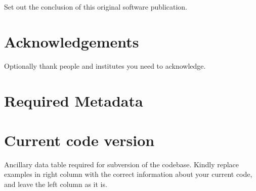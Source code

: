 \documentclass[preprint,12pt, a4paper]{elsarticle}
\begin{document}
Set out the conclusion of this original software publication.

\section*{Acknowledgements}
\label{}

Optionally thank people and institutes you need to acknowledge. 



{}







\section*{Required Metadata}
\label{}

\section*{Current code version}
\label{}

Ancillary data table required for subversion of the codebase. Kindly replace examples in right column with the correct information about your current code, and leave the left column as it is.
\end{document}
